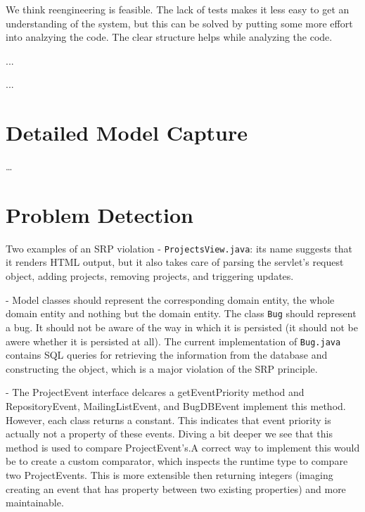\documentclass{article}
\begin{document}
We think reengineering is feasible. The lack of tests makes it less easy to get an understanding of the system, but this can be solved by putting some more effort into analzying the code. The clear structure helps while analyzing the code.

...

...

\section{Detailed Model Capture}
\ldots

\section{Problem Detection}
Two examples of an SRP violation
 - \verb|ProjectsView.java|: its name suggests that it renders HTML output, but it also takes care of parsing the servlet's request object, adding projects, removing projects, and triggering updates.

 - Model classes should represent the corresponding domain entity, the whole domain entity and nothing but the domain entity. The class \verb|Bug| should represent a bug. It should not be aware of the way in which it is persisted (it should not be awere whether it is persisted at all). The current implementation of \verb|Bug.java| contains SQL queries for retrieving the information from the database and constructing the object, which is a major violation of the SRP principle.

 - The ProjectEvent interface delcares a getEventPriority method and RepositoryEvent, MailingListEvent, and BugDBEvent implement this method. However, each class returns a constant. This indicates that event priority is actually not a property of these events. Diving a bit deeper we see that this method is used to compare ProjectEvent's.A correct way to implement this would be to create a custom comparator, which inspects the runtime type to compare two ProjectEvents. This is more extensible then returning integers (imaging creating an event that has property between two existing properties) and more maintainable.
\end{document}
